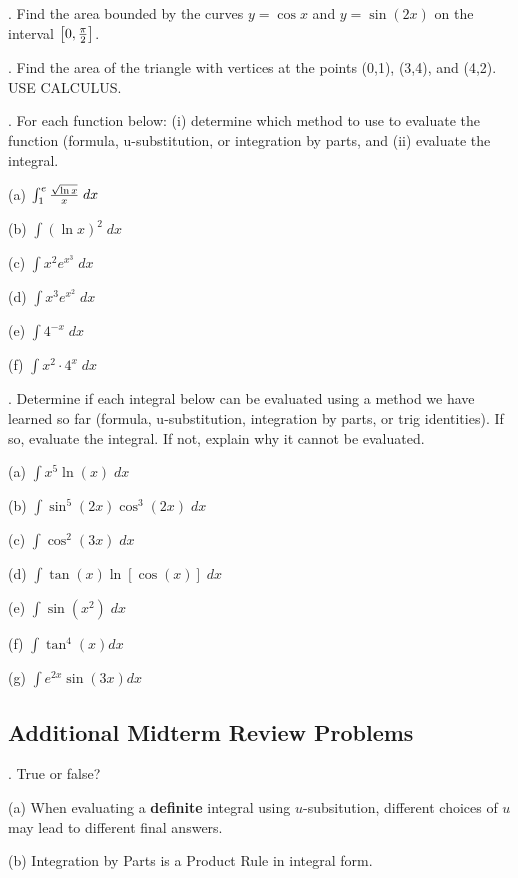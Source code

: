 \documentclass[12pt]{article}
\begin{document}
\medskip
{}.  Find the area bounded by the curves $y=\cos x$
and $y=\sin(2x)$ on the interval $\left [ 0, {{\pi}\over{2}} \right ]$.

\medskip
{}.  Find the area of the triangle with vertices at the points 
(0,1), (3,4), and (4,2).  USE CALCULUS.

\medskip
{}.  For each function below: (i) determine which method to use to 
evaluate the function (formula, u-substitution, or integration by parts, 
and (ii) evaluate the integral.

\medskip
\noindent (a) $\int_1^e {{\sqrt{\ln x}}\over{x}} \; dx$

\noindent (b) $\int (\ln x)^2 \; dx$

\noindent (c) $\int x^2 e^{x^3} \; dx$

\noindent (d)  $\int x^3 e^{x^2} \; dx$

\noindent (e) $\int 4^{-x} \; dx$

\noindent (f)  $\int x^2 \cdot 4^x \; dx$

\bigskip
{}. Determine if each integral below can be evaluated using a method we 
have 
learned so far (formula, u-substitution, integration by parts, or trig identities).  
If so, evaluate the integral.  If not, explain why it cannot be evaluated.

\medskip
\noindent (a)  $\int x^5 \ln (x) \; dx$

\noindent (b)  $\int \sin^5(2x) \cos^3 (2x) \; dx$

\noindent (c)  $\int \cos^2 (3x) \; dx$

\noindent (d)  $\int \tan (x) \ln [\cos (x)] \; dx$

\noindent (e)  $\int \sin \left (x^2 \right ) \; dx$

\noindent (f)  $\int \tan^4(x) dx$

\noindent (g)  $\int e^{2x} \sin(3x) dx$

\vskip 1in

\subsection*{Additional Midterm Review Problems}

.  True or false?

\noindent (a) When evaluating a {\bf definite} integral using $u$-subsitution, 
different choices of $u$ may lead to different final answers.

\noindent (b) Integration by Parts is a Product Rule in integral form.
\end{document}
